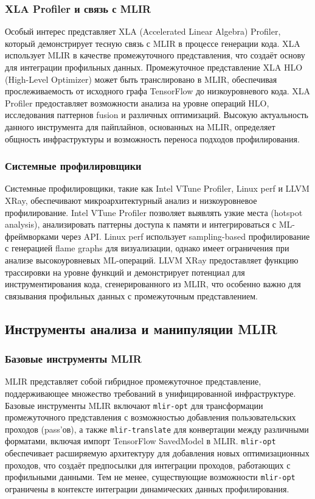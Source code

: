 \subsubsection{XLA Profiler и связь с MLIR}
Особый интерес представляет XLA (Accelerated Linear Algebra) Profiler, который демонстрирует тесную связь с MLIR в процессе генерации кода. XLA использует MLIR в качестве промежуточного представления, что создаёт основу для интеграции профильных данных. Промежуточное представление XLA HLO (High-Level Optimizer) может быть транслировано в MLIR, обеспечивая прослеживаемость от исходного графа TensorFlow до низкоуровневого кода.
XLA Profiler предоставляет возможности анализа на уровне операций HLO, исследования паттернов fusion и различных оптимизаций. Высокую актуальность данного инструмента для пайплайнов, основанных на MLIR, определяет общность инфраструктуры и возможность переноса подходов профилирования.

\subsubsection{Системные профилировщики}
Системные профилировщики, такие как Intel VTune Profiler, Linux perf и LLVM XRay, обеспечивают микроархитектурный анализ и низкоуровневое профилирование. Intel VTune Profiler позволяет выявлять узкие места (hotspot analysis), анализировать паттерны доступа к памяти и интегрироваться с ML-фреймворками через API. Linux perf использует sampling-based профилирование с генерацией flame graphs для визуализации, однако имеет ограничения при анализе высокоуровневых ML-операций.
LLVM XRay предоставляет функцию трассировки на уровне функций и демонстрирует потенциал для инструментирования кода, сгенерированного из MLIR, что особенно важно для связывания профильных данных с промежуточным представлением.

\subsection{Инструменты анализа и манипуляции MLIR}

\subsubsection{Базовые инструменты MLIR}
MLIR представляет собой гибридное промежуточное представление, поддерживающее множество требований в унифицированной инфраструктуре. Базовые инструменты MLIR включают \texttt{mlir-opt} для трансформации промежуточного представления с возможностью добавления пользовательских проходов (pass’ов), а также \texttt{mlir-translate} для конвертации между различными форматами, включая импорт TensorFlow SavedModel в MLIR.
\texttt{mlir-opt} обеспечивает расширяемую архитектуру для добавления новых оптимизационных проходов, что создаёт предпосылки для интеграции проходов, работающих с профильными данными. Тем не менее, существующие возможности \texttt{mlir-opt} ограничены в контексте интеграции динамических данных профилирования.

